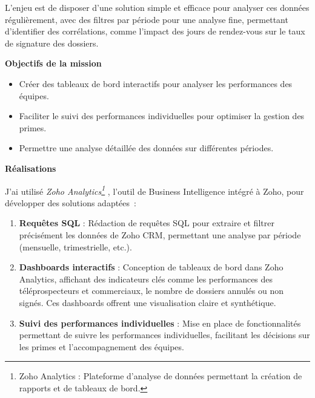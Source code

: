 L’enjeu est de disposer d’une solution simple et efficace pour analyser ces données régulièrement, avec des filtres par période pour une analyse fine, permettant d’identifier des corrélations, comme l’impact des jours de rendez-vous sur le taux de signature des dossiers.\vspace{0.3cm}

\textbf{Objectifs de la mission}\vspace{0.3cm}

\begin{itemize}
    \item Créer des tableaux de bord interactifs pour analyser les performances des équipes.\vspace{0.3cm}
    \item Faciliter le suivi des performances individuelles pour optimiser la gestion des primes.\vspace{0.3cm}
    \item Permettre une analyse détaillée des données sur différentes périodes.\vspace{0.3cm}
\end{itemize}

\textbf{Réalisations}\vspace{0.3cm}

J’ai utilisé \textit{Zoho  Analytics\footnote{Zoho Analytics : Plateforme d'analyse de données permettant la création de rapports et de tableaux de bord.}
}, l’outil de Business Intelligence intégré à Zoho, pour développer des solutions adaptées~:

\begin{enumerate}
    \item \textbf{Requêtes SQL} : Rédaction de requêtes SQL pour extraire et filtrer précisément les données de Zoho CRM, permettant une analyse par période (mensuelle, trimestrielle, etc.).\vspace{0.3cm}
    \item \textbf{Dashboards interactifs} : Conception de tableaux de bord dans  Zoho Analytics, affichant des indicateurs clés comme les performances des téléprospecteurs et commerciaux, le nombre de dossiers annulés ou non signés. Ces dashboards offrent une visualisation claire et synthétique.\vspace{0.3cm}
    \item \textbf{Suivi des performances individuelles} : Mise en place de fonctionnalités permettant de suivre les performances individuelles, facilitant les décisions sur les primes et l’accompagnement des équipes.\vspace{0.3cm}
\end{enumerate}

